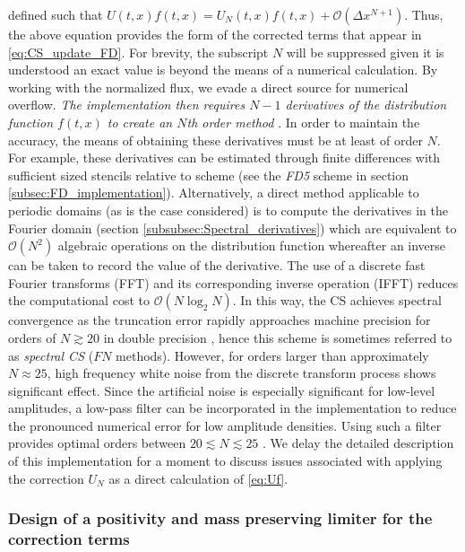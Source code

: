 \documentclass[11pt,titlepage]{report}
\begin{document}
\noindent defined such that $U(t,x)f(t,x) = U_N(t,x)f(t,x) + \mathcal{O}(\Delta x^{N+1})$. Thus, the above equation provides the form of the corrected terms that appear in \eqref{eq:CS_update_FD}. For brevity, the subscript $N$ will be suppressed given it is understood an exact value is beyond the means of a numerical calculation. By working with the normalized flux, we evade a direct source for numerical overflow. \emph{The implementation then requires $N-1$ derivatives of the distribution function $f(t,x)$ to create an $N$th order method} \label{pg:deriv_reqs}. In order to maintain the accuracy, the means of obtaining these derivatives must be at least of order $N$. For example, these derivatives can be estimated through finite differences with sufficient sized stencils relative to scheme (see the \emph{FD5} scheme in section \ref{subsec:FD_implementation}). Alternatively, a direct method applicable to periodic domains (as is the case considered) is to compute the derivatives in the Fourier domain (section \ref{subsubsec:Spectral_derivatives}) which are equivalent to $\mathcal{O}(N^2)$ algebraic operations on the distribution function whereafter an inverse can be taken to record the value of the derivative. The use of a discrete fast Fourier transforms (FFT) and its corresponding inverse operation (IFFT) reduces the computational cost to $\mathcal{O}(N\log_2N)$. In this way, the CS achieves spectral convergence as the truncation error rapidly approaches machine precision for orders of $N \gtrsim 20$ in double precision \cite{Guclu14}, hence this scheme is sometimes referred to as \emph{spectral CS} ($FN$ methods). However, for orders larger than approximately $N \approx 25$, high frequency white noise from the discrete transform process shows significant effect. Since the artificial noise is especially significant for low-level amplitudes, a low-pass filter can be incorporated in the implementation to reduce the pronounced numerical error for low amplitude densities. Using such a filter provides optimal orders between $20 \lesssim N \lesssim 25$ \cite{Guclu14}. We delay the detailed description of this implementation for a moment to discuss issues associated with applying the correction $U_N$ as a direct calculation of \eqref{eq:Uf}. 


\subsubsection{Design of a positivity and mass preserving limiter for the correction terms}
\end{document}
